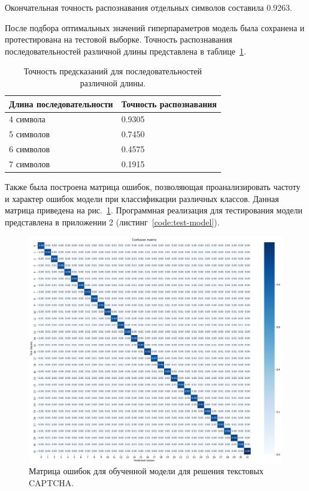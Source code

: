 Окончательная точность распознавания отдельных символов составила 0.9263.

После подбора оптимальных значений гиперпараметров модель была сохранена и 
протестирована на тестовой выборке. Точность распознавания последовательностей 
различной длины представлена в таблице~\ref{tab:probability}.

\begin{table}[H]
    \centering
    \caption{Точность предсказаний для последовательностей различной длины.}
    \begin{tabular}{|l|l|}
        \hline
        Длина последовательности & Точность распознавания \\
        \hline
        4 символа & 0.9305 \\
        \hline
        5 символов & 0.7450 \\
        \hline
        6 символов & 0.4575 \\
        \hline
        7 символов & 0.1915 \\
        \hline
    \end{tabular}
    \label{tab:probability}
\end{table}

Также была построена матрица ошибок, позволяющая проанализировать частоту и 
характер ошибок модели при классификации различных классов. Данная матрица 
приведена на рис.~\ref{fig:cm}. Программная реализация для тестирования модели 
представлена в приложении 2 (листинг~\ref{code:test-model}).

\begin{figure}[H]
    \centering
    \includegraphics[width=1\linewidth]{imgs/textcaptcha/Confusion_matrix.png}
    \caption{Матрица ошибок для обученной модели для решения текстовых CAPTCHA.}
    \label{fig:cm}
\end{figure}
\vspace{-0.85cm}

